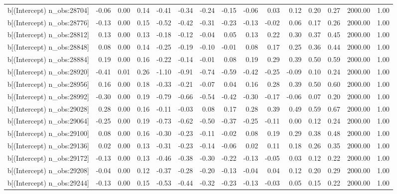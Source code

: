 \begin{table}[ht]
\begin{tabular}{rrrrrrrrrrrrrrr}
  b[(Intercept) n\_obs:28704] & -0.06 & 0.00 & 0.14 & -0.41 & -0.34 & -0.24 & -0.15 & -0.06 & 0.03 & 0.12 & 0.20 & 0.27 & 2000.00 & 1.00 \\ 
  b[(Intercept) n\_obs:28776] & -0.13 & 0.00 & 0.15 & -0.52 & -0.42 & -0.31 & -0.23 & -0.13 & -0.02 & 0.06 & 0.17 & 0.26 & 2000.00 & 1.00 \\ 
  b[(Intercept) n\_obs:28812] & 0.13 & 0.00 & 0.13 & -0.18 & -0.12 & -0.04 & 0.05 & 0.13 & 0.22 & 0.30 & 0.37 & 0.45 & 2000.00 & 1.00 \\ 
  b[(Intercept) n\_obs:28848] & 0.08 & 0.00 & 0.14 & -0.25 & -0.19 & -0.10 & -0.01 & 0.08 & 0.17 & 0.25 & 0.36 & 0.44 & 2000.00 & 1.00 \\ 
  b[(Intercept) n\_obs:28884] & 0.19 & 0.00 & 0.16 & -0.22 & -0.14 & -0.01 & 0.08 & 0.19 & 0.29 & 0.39 & 0.50 & 0.59 & 2000.00 & 1.00 \\ 
  b[(Intercept) n\_obs:28920] & -0.41 & 0.01 & 0.26 & -1.10 & -0.91 & -0.74 & -0.59 & -0.42 & -0.25 & -0.09 & 0.10 & 0.24 & 2000.00 & 1.00 \\ 
  b[(Intercept) n\_obs:28956] & 0.16 & 0.00 & 0.18 & -0.33 & -0.21 & -0.07 & 0.04 & 0.16 & 0.28 & 0.39 & 0.50 & 0.60 & 2000.00 & 1.00 \\ 
  b[(Intercept) n\_obs:28992] & -0.30 & 0.00 & 0.19 & -0.79 & -0.66 & -0.54 & -0.42 & -0.30 & -0.17 & -0.06 & 0.07 & 0.20 & 2000.00 & 1.00 \\ 
  b[(Intercept) n\_obs:29028] & 0.28 & 0.00 & 0.16 & -0.11 & -0.03 & 0.08 & 0.17 & 0.28 & 0.39 & 0.49 & 0.59 & 0.67 & 2000.00 & 1.00 \\ 
  b[(Intercept) n\_obs:29064] & -0.25 & 0.00 & 0.19 & -0.73 & -0.62 & -0.50 & -0.37 & -0.25 & -0.11 & 0.00 & 0.12 & 0.24 & 2000.00 & 1.00 \\ 
  b[(Intercept) n\_obs:29100] & 0.08 & 0.00 & 0.16 & -0.30 & -0.23 & -0.11 & -0.02 & 0.08 & 0.19 & 0.29 & 0.38 & 0.48 & 2000.00 & 1.00 \\ 
  b[(Intercept) n\_obs:29136] & 0.02 & 0.00 & 0.13 & -0.31 & -0.23 & -0.14 & -0.06 & 0.02 & 0.11 & 0.18 & 0.26 & 0.35 & 2000.00 & 1.00 \\ 
  b[(Intercept) n\_obs:29172] & -0.13 & 0.00 & 0.13 & -0.46 & -0.38 & -0.30 & -0.22 & -0.13 & -0.05 & 0.03 & 0.12 & 0.22 & 2000.00 & 1.00 \\ 
  b[(Intercept) n\_obs:29208] & -0.04 & 0.00 & 0.12 & -0.37 & -0.28 & -0.20 & -0.13 & -0.04 & 0.04 & 0.12 & 0.20 & 0.29 & 2000.00 & 1.00 \\ 
  b[(Intercept) n\_obs:29244] & -0.13 & 0.00 & 0.15 & -0.53 & -0.44 & -0.32 & -0.23 & -0.13 & -0.03 & 0.05 & 0.15 & 0.22 & 2000.00 & 1.00 \\ 

\end{tabular}
\end{table}
